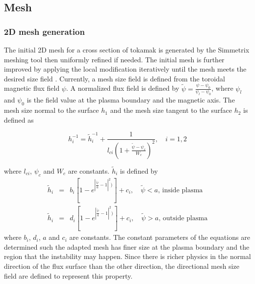 \documentclass[11pt]{article}  %
\begin{document}
\subsection{Mesh}\label{sec:mesh}

\subsubsection{2D mesh generation}
The initial 2D mesh for a cross section of tokamak is generated by the Simmetrix meshing tool \cite{simmetrix-web-page} then uniformly refined if needed. The initial mesh is further improved by applying the local modification iteratively until the mesh meets the desired size field \cite{li2003accounting,li20053d,alauzet2006parallel,sahni2007automated}. Currently, a mesh size field is defined from the toroidal magnetic flux field $\psi$. A normalized flux field is defined by $\tilde{\psi}=\frac{\psi-\psi_0}{\psi_l-\psi_0}$, where $\psi_l$ and $\psi_0$ is the field value at the plasma boundary and the magnetic axis. The mesh size normal to the surface $h_1$ and the mesh size tangent to the surface $h_2$ is defined as

\begin{equation}
h_i^{-1}=\tilde{h}_i^{-1}+\frac{1}{l_{ci}\left(1+\frac{\tilde{\psi}-\psi_c}{W_c}\right)^2}, \quad i=1,2
\end{equation}

where $l_{ci}$, $\psi_c$ and $W_c$ are constants. 
$\tilde{h}_i$ is defined by
\begin{eqnarray}
\tilde{h}_i&=&b_i[1-e^{|\frac{\tilde{\psi}}{a}-1|^2)}]+c_i, \quad \tilde{\psi}<a,\, \text{inside plasma} \nonumber \\ 
\tilde{h}_i&=&d_i[1-e^{|\frac{\tilde{\psi}}{a}-1|^2)}]+c_i, \quad \tilde{\psi}>a, \, \text{outside plasma}
\end{eqnarray}
where $b_i$, $d_i$, $a$ and $c_i$ are constants. The constant parameters of the equations are determined such the adapted mesh has finer size at the plasma boundary and the region that the instability may happen. Since there is richer physics in the normal direction of the flux surface than the other direction, the directional mesh size field are defined to represent this property.
\end{document}
